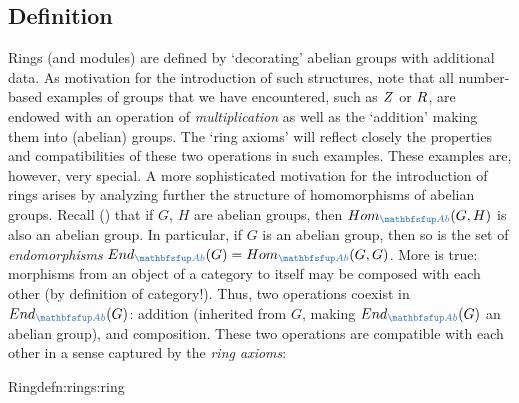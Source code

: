 \subsection{Definition}
\label{subsec:rings:definition}
Rings (and modules) are defined by `decorating' abelian groups with
additional data.  As motivation for the introduction of such
structures, note that all number-based examples of groups that we have
encountered, such as $Z$ or $R$, are endowed with an operation of
\emph{multiplication} as well as the `addition' making them into
(abelian) groups. The `ring axioms' will reflect closely the
properties and compatibilities of these two operations in such
examples.  These examples are, however, very special. A more
sophisticated motivation for the introduction of rings arises by
analyzing further the structure of homomorphisms of abelian
groups. Recall
() that if $G$,
$H$ are abelian groups, then $\Hom_{\categ{Ab}}(G, H)$ is also an
abelian group. In particular, if $G$ is an abelian group, then so is
the set of \emph{endomorphisms}
$\End_{\categ{Ab}}(G) = \Hom_{\categ{Ab}}(G, G)$. More is true:
morphisms from an object of a category to itself may be composed with
each other (by definition of category!). Thus, two operations coexist
in $\End_{\categ{Ab}}(G)$: addition (inherited from $G$, making
$\End_{\categ{Ab}}(G)$ an abelian group), and composition. These two
operations are compatible with each other in a sense captured by the
\emph{ring axioms}:
\begin{defn}{Ring}{defn:rings:ring}
\end{defn}
